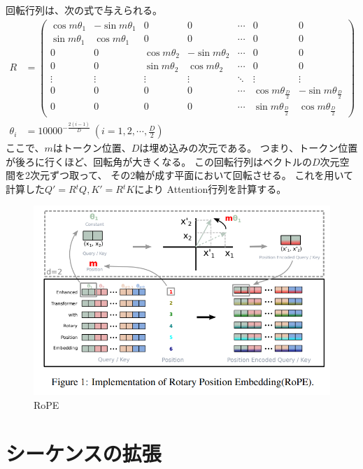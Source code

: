 \documentclass{jsarticle}
\begin{document}
    回転行列は、次の式で与えられる。
    \begin{align}
        R &= \begin{pmatrix}
                \cos m\theta_1 & -\sin m\theta_1 & 0 & 0 & \cdots & 0 & 0 \\
                \sin m\theta_1 & \cos m\theta_1 & 0 & 0 & \cdots & 0 & 0 \\
                0 & 0 & \cos m\theta_2 & -\sin m\theta_2 & \cdots & 0 & 0 \\
                0 & 0 & \sin m\theta_2 & \cos m\theta_2 & \cdots & 0 & 0 \\
                \vdots & \vdots & \vdots & \vdots & \ddots & \vdots & \vdots \\
                0 & 0 & 0 & 0 & \cdots & \cos m\theta_\frac{D}{2} & -\sin m\theta_\frac{D}{2} \\
                0 & 0 & 0 & 0 & \cdots & \sin m\theta_\frac{D}{2} & \cos m\theta_\frac{D}{2}
            \end{pmatrix} \label{equ:rope} \\
        \theta_i &= 10000^{-\frac{2(i-1)}{D}} \ \left(i = 1, 2, \cdots, \frac{D}{2}\right) \nonumber
    \end{align}
    ここで、$m$はトークン位置、$D$は埋め込みの次元である。
    つまり、トークン位置が後ろに行くほど、回転角が大きくなる。
    この回転行列はベクトルの$D$次元空間を2次元ずつ取って、
    その2軸が成す平面において回転させる。
    これを用いて計算した$Q' = R {}^t\!Q, K' = R {}^t\!K$により
    Attention行列を計算する。
    \begin{figure}[ht]
        \centering
        \includegraphics[width=.8\hsize]{rope_image.png}
        \caption{RoPE\cite{rope}}
    \end{figure}

\section{シーケンスの拡張}
\end{document}
